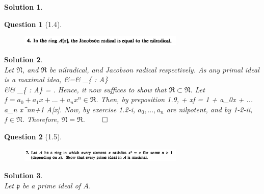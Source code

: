 \documentclass[11pt]{article}
\theoremstyle{plain}
\def\eQb#1\eQe{\begin{eqnarray*}#1\end{eqnarray*}}
\theoremstyle{quest}
\newtheorem*{question}{Question}
\newtheorem*{solution}{Solution}
\begin{document}
\begin{solution} \hfill \\


\end{solution}
\begin{question}[1.4]
\hfill
\begin{figure}[h!]
  \centering
    \includegraphics[width=0.7\textwidth]{d-1-4.png}
\end{figure}
\end{question}
\begin{solution} \hfill \\
Let $\mathfrak{N}$, and $\mathfrak{R}$ be nilradical, and Jacobson radical 
respectively. As any primal ideal is a maximal idea,
\eQb
\mathfrak{N} &=& \bigcap_{\{ \> : \>  
\> A\}}  \\ 
&\subset& 
\bigcap_{\{  \> : \>  \> A\}} 
= .
\eQe
Hence, it now suffices to show that $\mathfrak{R} \subset \mathfrak{N}$.
Let $f = a_0 + a_1x + ... + a_n x^n \in \mathfrak{R}$. Then, by preposition 1.9,
\eQb
1 + xf = 1 + a_0x + ... a_n x^n{n+1} \>\>\>  \>\>\> A[x].
\eQe 
Now, by exercise 1.2-i, $a_0 , ... , a_n$ are nilpotent, and by 1-2-ii,
$f \in \mathfrak{N}$. Therefore, $\mathfrak{N} = \mathfrak{R}$. \hfill $\qed$


\end{solution}

\bigskip

\begin{question}[1.5]
\hfill
\begin{figure}[h!]
  \centering
    \includegraphics[width=0.7\textwidth]{d-1-7.png}
\end{figure}
\end{question}
\begin{solution} \hfill \\
Let $\mathfrak{p}$ be a prime ideal of $A$. 

\end{solution}

\newpage
\end{document}
